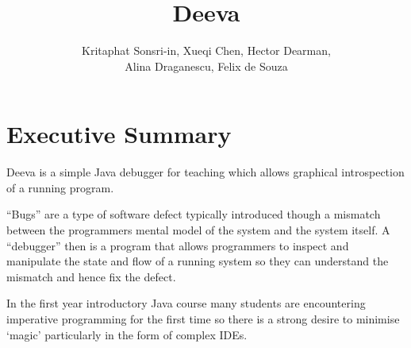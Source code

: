 \documentclass[11pt, a4paper]{article}
\newcommand{\subtitle}[1]{
  \posttitle{
    \par\end{center}
    \begin{center}\large#1\end{center}
    \vskip0.5em}
}
\begin{document}
\title{Deeva}
\subtitle{Final Report}
\author{Kritaphat Sonsri-in, Xueqi Chen, Hector Dearman, \\Alina Draganescu, Felix de Souza}

\maketitle
\thispagestyle{empty} %






\section*{Executive Summary}
Deeva is a simple Java debugger for teaching which allows graphical introspection of a running program.

``Bugs'' are a type of software defect typically introduced though a mismatch between the programmers mental model of the system and the system itself.
A ``debugger'' then is a program that allows programmers to inspect and manipulate the state and flow of a running system so they can understand the mismatch and hence fix the defect.

In the first year introductory Java course many students are encountering imperative programming for the first time so there is a strong desire  to minimise `magic' particularly in the form of complex IDEs.
\end{document}
